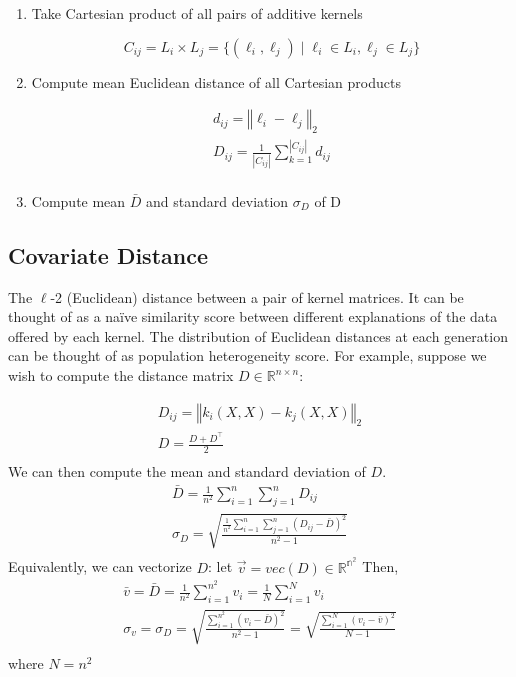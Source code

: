 \documentclass{article}
\begin{document}
\begin{enumerate}
\item Take Cartesian product of all pairs of additive kernels

\[C_{ij} = L_i\times L_j = \{(\ell_i, \ell_j) \mid \ell_i \in L_i,  \ell_j \in L_j\}\]

\item Compute mean Euclidean distance of all Cartesian products

\begin{gather*}
    d_{ij} = \left\Vert \ell_i - \ell_j \right\Vert_2\\
    D_{ij} = \frac{1}{\left\vert C_{ij} \right\vert}\sum_{k=1}^{\left\vert C_{ij} \right\vert}d_{ij}\\
\end{gather*}

\item Compute mean $\bar{D}$ and standard deviation $\sigma_D$ of D

\end{enumerate}

\subsection{Covariate Distance}\label{subsec:covariate-distance}
The $\ell$-2 (Euclidean) distance between a pair of kernel matrices.
It can be thought of as a naïve similarity score between different explanations of the data offered by each kernel.
The distribution of Euclidean distances at each generation can be thought of as population heterogeneity score.
For example, suppose we wish to compute the distance matrix $D \in \mathbb{R}^{n \times n}$:

\begin{gather*}
    D_{ij} = \left\Vert k_i(X, X) - k_j(X, X) \right\Vert_2\\
    D = \frac{D + D^\top}{2}\\
\end{gather*}
We can then compute the mean and standard deviation of $D$.
\begin{gather*}
    \bar{D} = \frac{1}{n^2} \sum_{i=1}^{n}\sum_{j=1}^{n} D_{ij}\\
    \sigma_D = \sqrt{\frac{\frac{1}{n^2} \sum_{i=1}^{n}\sum_{j=1}^{n} (D_{ij} - \bar{D})^2}{n^2 - 1}}\\
\end{gather*}
Equivalently, we can vectorize $D$:
let $\vec{v} = vec(D)\in \mathbb{R^{n^2}}$
Then,
\begin{gather*}
    \bar{v} = \bar{D} = \frac{1}{n^2}\sum_{i=1}^{n^2} v_{i} = \frac{1}{N}\sum_{i=1}^{N} v_{i}\\
    \sigma_v = \sigma_D = \sqrt{\frac{\sum_{i=1}^{n^2} (v_i - \bar{D})^2}{n^2 - 1}} = \sqrt{\frac{\sum_{i=1}^{N} (v_i - \bar{v})^2}{N - 1}}\\
\end{gather*}
where $N = n^2$
\end{document}

